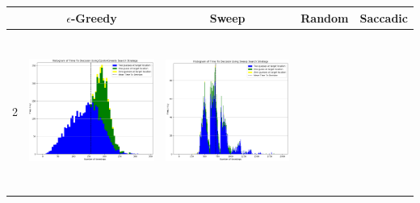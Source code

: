 \begin{landscape}
\begin{table}[h!]
  \centering
  \begin{tabular}{ | c | c | c | c | c |}
    \hline
    & $\epsilon$-Greedy & Sweep & Random & Saccadic \\
    \hline
    2 & 
    \begin{minipage}[c][58mm][c]{49mm}
      \includegraphics[width=49mm, height=52mm]{Chapters/MultiAgentTargetDetection/Figs/Histograms/MultipleTarget/2/2EpsilonGreedyHistogram.png}
    \end{minipage}
    &
    \begin{minipage}[c][58mm][c]{49mm}
      \includegraphics[width=49mm, height=52mm]{Chapters/MultiAgentTargetDetection/Figs/Histograms/MultipleTarget/2/2SweepHistogram.png}


\end{minipage}
\end{tabular}
\end{table}
\end{landscape}

